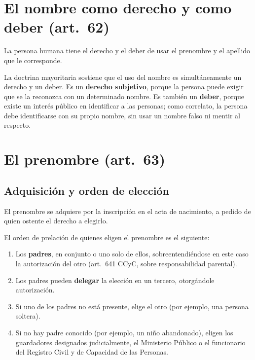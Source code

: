 \documentclass[12pt,oneside]{book}
\begin{document}
\section{El nombre como derecho y como deber (art.~62)}

\begin{regla}
La persona humana tiene el derecho y el deber de usar el prenombre y el apellido que le corresponde.
\end{regla}

La doctrina mayoritaria sostiene que el uso del nombre es simultáneamente un derecho y un deber. Es un \textbf{derecho subjetivo}, porque la persona puede exigir que se la reconozca con un determinado nombre. Es también un \textbf{deber}, porque existe un interés público en identificar a las personas; como correlato, la persona debe identificarse con su propio nombre, sin usar un nombre falso ni mentir al respecto.

\section{El prenombre (art.~63)}

\subsection{Adquisición y orden de elección}

\begin{regla}
El prenombre se adquiere por la inscripción en el acta de nacimiento, a pedido de quien ostente el derecho a elegirlo.
\end{regla}

El orden de prelación de quienes eligen el prenombre es el siguiente:

\begin{enumerate}
\item Los \textbf{padres}, en conjunto o uno solo de ellos, sobreentendiéndose en este caso la autorización del otro (art.~641 CCyC, sobre responsabilidad parental).
\item Los padres pueden \textbf{delegar} la elección en un tercero, otorgándole autorización.
\item Si uno de los padres no está presente, elige el otro (por ejemplo, una persona soltera).
\item Si no hay padre conocido (por ejemplo, un niño abandonado), eligen los guardadores designados judicialmente, el Ministerio Público o el funcionario del Registro Civil y de Capacidad de las Personas.
\end{enumerate}
\end{document}
